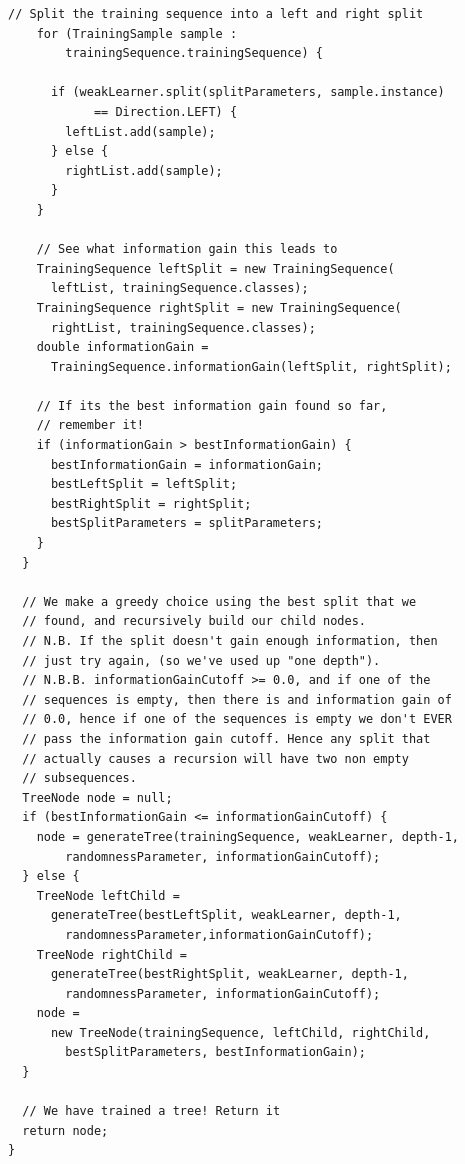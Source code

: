 \documentclass[12pt,twoside,notitlepage]{report}
\begin{document}
\begin{lstlisting}[float=tp,caption={The implementation code for tree generation.}, label={lst:actualGenerateTree}]
    // Split the training sequence into a left and right split
    for (TrainingSample sample : 
        trainingSequence.trainingSequence) {

      if (weakLearner.split(splitParameters, sample.instance) 
            == Direction.LEFT) {
        leftList.add(sample);
      } else {
        rightList.add(sample);
      }
    }
    
    // See what information gain this leads to
    TrainingSequence leftSplit = new TrainingSequence(
      leftList, trainingSequence.classes);
    TrainingSequence rightSplit = new TrainingSequence(
      rightList, trainingSequence.classes);
    double informationGain = 
      TrainingSequence.informationGain(leftSplit, rightSplit);
    
    // If its the best information gain found so far, 
    // remember it!
    if (informationGain > bestInformationGain) {
      bestInformationGain = informationGain;
      bestLeftSplit = leftSplit;
      bestRightSplit = rightSplit;
      bestSplitParameters = splitParameters;
    }
  }
  
  // We make a greedy choice using the best split that we 
  // found, and recursively build our child nodes.
  // N.B. If the split doesn't gain enough information, then 
  // just try again, (so we've used up "one depth").
  // N.B.B. informationGainCutoff >= 0.0, and if one of the 
  // sequences is empty, then there is and information gain of 
  // 0.0, hence if one of the sequences is empty we don't EVER 
  // pass the information gain cutoff. Hence any split that 
  // actually causes a recursion will have two non empty 
  // subsequences.
  TreeNode node = null;
  if (bestInformationGain <= informationGainCutoff) {
    node = generateTree(trainingSequence, weakLearner, depth-1, 
        randomnessParameter, informationGainCutoff);
  } else {
    TreeNode leftChild = 
      generateTree(bestLeftSplit, weakLearner, depth-1, 
        randomnessParameter,informationGainCutoff);
    TreeNode rightChild = 
      generateTree(bestRightSplit, weakLearner, depth-1, 
        randomnessParameter, informationGainCutoff);
    node = 
      new TreeNode(trainingSequence, leftChild, rightChild, 
        bestSplitParameters, bestInformationGain);
  }
  
  // We have trained a tree! Return it
  return node;
}
    \end{lstlisting}
\end{document}
